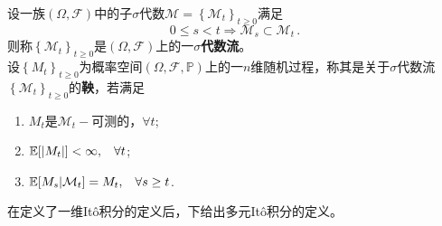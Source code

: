 \documentclass[oneside]{sysuthesis}
\begin{document}
\begin{definition}[鞅]\label{def:martingale}
	设一族$(\Omega,\mathcal{F})$中的子$\sigma$代数$\mathcal{M}=\left\{\mathcal{M}_t\right\}_{t\ge0}$满足
	\[
	0\le s<t\Rightarrow\mathcal{M}_s\subset\mathcal{M}_t\,.
	\]
	则称$\left\{\mathcal{M}_t\right\}_{t\ge0}$是$(\Omega,\mathcal{F})$上的一\textbf{$\sigma$代数流}。\\
	\hspace*{2em}设$\left\{M_t\right\}_{t\ge 0}$为概率空间$(\Omega,\mathcal{F},\mathbb{P})$上的一$n$维随机过程，称其是关于$\sigma$代数流$\left\{\mathcal{M}_t\right\}_{t\ge 0}$的\textbf{鞅}，若满足
	\begin{enumerate}[label=(\arabic*)]
		\item $M_t$是$\mathcal{M}_t-$可测的，\hspace{0.3cm}$\forall t$;
		\item $\mathbb{E}[\left\vert M_t\right\vert]<\infty,\hspace{0.3cm}\forall t$;
		\item $\mathbb{E}[M_s|\mathcal{M}_t]=M_t,\hspace{0.3cm}\forall s\ge t$.
	\end{enumerate}
\end{definition}

在定义了一维It\^o积分的定义后，下给出多元It\^o积分的定义。
\end{document}
